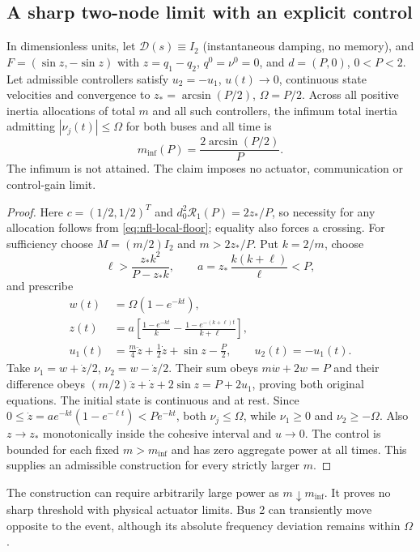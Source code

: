 \subsection{A sharp two-node limit with an explicit control}
\begin{theorem}
In dimensionless units, let $\mathcal D(s)\equiv I_2$ (instantaneous damping,
no memory), and $F=(\sin z,-\sin z)$ with
$z=q_1-q_2$, $q^0=\nu^0=0$, and $d=(P,0)$, $0<P<2$.
Let admissible controllers satisfy $u_2=-u_1$, $u(t)\to0$,
continuous state velocities and convergence to
$z_*=\arcsin(P/2)$, $\Omega=P/2$.
Across all positive inertia allocations of total $m$ and all such
controllers, the infimum total inertia admitting
$|\nu_j(t)|\leq\Omega$ for both buses and all time is
\begin{equation}
 \boxed{m_{\inf}(P)=\frac{2\arcsin(P/2)}{P}.}
 \label{eq:nfl-sharp}
\end{equation}
The infimum is not attained. The claim imposes no actuator, communication
or control-gain limit.
\end{theorem}
\begin{proof}
Here $c=(1/2,1/2)^T$ and
$d_0^2\mathcal R_1(P)=2z_*/P$, so necessity for any allocation follows
from \eqref{eq:nfl-local-floor}; equality also forces a crossing.
For sufficiency choose $M=(m/2)I_2$ and $m>2z_*/P$.
Put $k=2/m$, choose
\[
 \ell>\frac{z_*k^2}{P-z_*k},\qquad
 a=z_*\,\frac{k(k+\ell)}{\ell}<P,
\]
and prescribe
\begin{align}
 w(t)&=\Omega(1-e^{-kt}),\\
 z(t)&=a\left[\frac{1-e^{-kt}}{k}
                    -\frac{1-e^{-(k+\ell)t}}{k+\ell}\right],\\
 u_1(t)&=\frac m4\ddot z+\frac12\dot z+\sin z-\frac P2,\qquad
 u_2(t)=-u_1(t). \label{eq:nfl-construction}
\end{align}
Take $\nu_1=w+\dot z/2$, $\nu_2=w-\dot z/2$.
Their sum obeys $m\dot w+2w=P$ and their difference obeys
$(m/2)\ddot z+\dot z+2\sin z=P+2u_1$, proving both original equations.
The initial state is continuous and at rest.
Since $0\leq\dot z=a e^{-kt}(1-e^{-\ell t})<P e^{-kt}$,
both $\nu_j\leq\Omega$, while $\nu_1\geq0$ and $\nu_2\geq-\Omega$.
Also $z\to z_*$ monotonically inside the cohesive interval and $u\to0$.
The control is bounded for each fixed $m>m_{\inf}$ and has zero aggregate
power at all times. This supplies an admissible construction for every
strictly larger $m$.
\end{proof}
The construction can require arbitrarily large power as $m\downarrow
m_{\inf}$. It proves no sharp threshold with physical actuator limits.
Bus 2 can transiently move opposite to the event, although its absolute
frequency deviation remains within $\Omega$.

